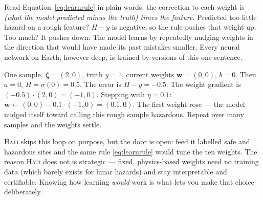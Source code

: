 \documentclass[11pt,oneside]{book}
\begin{document}
\begin{center}
\end{center}

\begin{intuition}
Read Equation~\eqref{eq:learnrule} in plain words: the correction to each weight is
\emph{(what the model predicted minus the truth) times the feature}. Predicted too
little hazard on a rough feature? $H-y$ is negative, so the rule pushes that weight up.
Too much? It pushes down. The model learns by repeatedly nudging weights in the
direction that would have made its past mistakes smaller. Every neural network on
Earth, however deep, is trained by versions of this one sentence.
\end{intuition}

\begin{example}
One sample, $\boldsymbol\zeta=(2,0)$, truth $y=1$, current weights $\mathbf w=(0,0)$,
$b=0$. Then $a=0$, $H=\sigma(0)=0.5$. The error is $H-y=-0.5$. The weight gradient is
$(-0.5)\cdot(2,0)=(-1,0)$. Stepping with $\eta=0.1$: $\mathbf w\leftarrow(0,0)-0.1\cdot
(-1,0)=(0.1,0)$. The first weight rose --- the model nudged itself toward calling this
rough sample hazardous. Repeat over many samples and the weights settle.
\end{example}

\begin{hatibox}
\textsc{Hati} skips this loop on purpose, but the door is open: feed it labelled safe
and hazardous sites and the same rule \eqref{eq:learnrule} would tune the ten weights.
The reason \textsc{Hati} does not is strategic --- fixed, physics-based weights need no
training data (which barely exists for lunar hazards) and stay interpretable and
certifiable. Knowing how learning \emph{would} work is what lets you make that choice
deliberately.
\end{hatibox}
\end{document}
